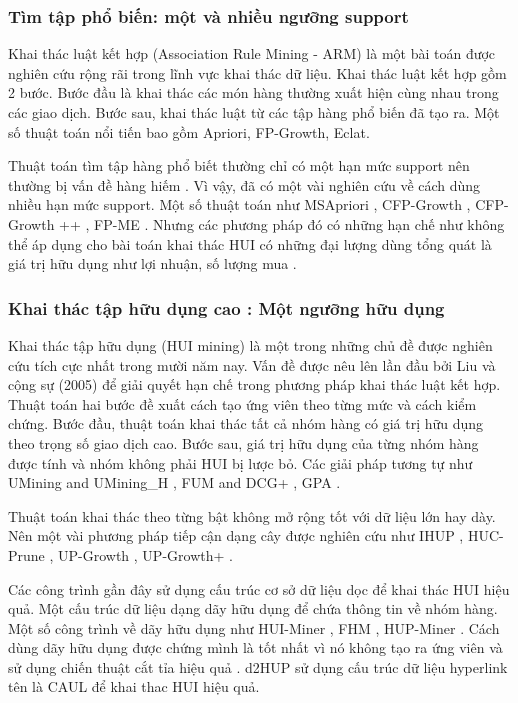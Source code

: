 \subsubsection{Tìm tập phổ biến: một và nhiều ngưỡng support}

Khai thác luật kết hợp (Association Rule Mining - ARM) là một bài toán được nghiên cứu rộng rãi trong lĩnh vực khai thác dữ liệu. Khai thác luật kết hợp gồm 2 bước. Bước đầu là khai thác các món hàng thường xuất hiện cùng nhau trong các giao dịch. Bước sau, khai thác luật từ các tập hàng phổ biến đã tạo ra. Một số thuật toán nổi tiến bao gồm Apriori\cite{agrawal1994fast}, FP-Growth\cite{han2000mining}, Eclat\cite{zaki2000scalable}. 

Thuật toán tìm tập hàng phổ biết thường chỉ có một hạn mức support nên thường bị vấn đề hàng hiếm \cite{liu1999mining}. Vì vậy, đã có một vài nghiên cứu về cách dùng nhiều hạn mức support. Một số thuật toán như MSApriori \cite{liu1999mining}, CFP-Growth \cite{hu2006mining}, CFP-Growth ++ \cite{kiran2011novel}, FP-ME \cite{gan2017mining}. Nhưng các phương pháp đó có những hạn chế như không thể áp dụng cho bài toán khai thác HUI có những đại lượng dùng tổng quát là giá trị hữu dụng như lợi nhuận, số lượng mua \cite{lin2016efficient}. 

\subsubsection{Khai thác tập hữu dụng cao : Một ngưỡng hữu dụng}

Khai thác tập hữu dụng (HUI mining) là một trong những chủ đề được nghiên cứu tích cực nhất trong mười năm nay. Vấn đề được nêu lên lần đầu bởi Liu và cộng sự (2005) để giải quyết hạn chế trong phương pháp khai thác luật kết hợp. Thuật toán hai bước \cite{liu2005two} đề xuất cách tạo ứng viên theo từng mức và cách kiểm chứng. Bước đầu, thuật toán khai thác tất cả nhóm hàng có giá trị hữu dụng theo trọng số giao dịch cao. Bước sau, giá trị hữu dụng của từng nhóm hàng được tính và nhóm không phải HUI bị lược bỏ. Các giải pháp tương tự như UMining and UMining\_H \cite{yao2006mining}, FUM and DCG+ \cite{li2008isolated}, GPA \cite{lan2012efficient}.

Thuật toán khai thác theo từng bật không mở rộng tốt với dữ liệu lớn hay dày. Nên một vài phương pháp tiếp cận dạng cây được nghiên cứu như IHUP \cite{ahmed2009efficient}, HUC-Prune \cite{ahmed2011huc}, UP-Growth \cite{tseng2010up}, UP-Growth+ \cite{tseng2013efficient}.

Các công trình gần đây sử dụng cấu trúc cơ sở dữ liệu dọc để khai thác HUI hiệu quả. Một cấu trúc dữ liệu dạng dãy hữu dụng để chứa thông tin về nhóm hàng. Một số công trình về dãy hữu dụng như HUI-Miner \cite{liu2012mining}, FHM \cite{fournier2014fhm}, HUP-Miner \cite{krishnamoorthy2015pruning}. Cách dùng dãy hữu dụng được chứng mình là tốt nhất vì nó không tạo ra ứng viên và sử dụng chiến thuật cắt tỉa hiệu quả \cite{fournier2014fhm} \cite{liu2012mining}. d2HUP \cite{liu2012mining} sử dụng cấu trúc dữ liệu hyperlink tên là CAUL để khai thac HUI hiệu quả.


